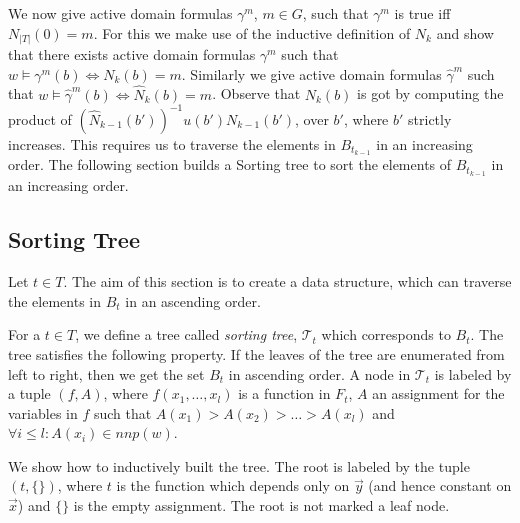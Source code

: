 \documentclass[envcountsame]{llncs}
\begin{document}
We now give active domain formulas $\gamma^m$, $m \in G$, such that $\gamma^m$ is true iff $N_{|T|}(0)=m$. For this we make use of the
inductive definition of $N_k$ and show that there exists active domain formulas $\gamma^m$ such that $w \models \gamma^m(b) \Leftrightarrow N_k(b)=m$.
Similarly we give active domain formulas $\hat \gamma^m$ such that $w \models \hat \gamma^m(b) \Leftrightarrow \hat N_k(b)=m$.
Observe that $N_k(b)$ is got by computing the product of 
$\left(\hat N_{k-1}(b')\right)^{-1} u(b') N_{k-1}(b')$, over $b'$, where $b'$ strictly increases. This requires us to traverse the elements in $B_{t_{k-1}}$ in an increasing order. The following section builds a Sorting tree to sort the elements of $B_{t_{k-1}}$ in an increasing order.



 
\subsection{Sorting Tree} \label{subsec_sortingtree}
Let $t \in T$. The aim of this section is to create a data structure, which can traverse the elements in $B_t$ in an ascending order. 



For a $t \in T$, we define a tree called \emph{sorting tree}, $\mathcal{T}_t$ which corresponds to $B_t$. The tree satisfies the
following property.
If the leaves of the tree are enumerated from left to right, then we get the set $B_t$ in ascending order.
A node in $\mathcal{T}_t$ is labeled by a tuple $(f,A)$, where $f(x_1,\dots, x_l)$ is a function in $F_t$, $A$ an assignment for the variables in $f$ 
such that $A(x_1)>A(x_2)>\dots>A(x_l)$ and $\forall i\leq l: A(x_i) \in nnp(w)$. 

We show how to inductively built the tree. The root is labeled by the tuple $(t,\{\})$, where $t$ is the function which depends only on $\vec y$ (and hence constant on $\vec x$)
 and $\{\}$ is the empty assignment. The root is not marked a leaf node.
\end{document}
